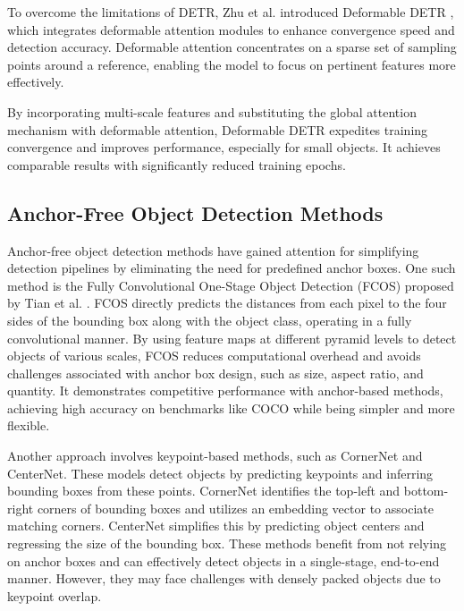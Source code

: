 \documentclass[3p,times]{elsarticle}
\begin{document}
To overcome the limitations of DETR, Zhu et al. introduced Deformable DETR \cite{zhu2021deformabledetrdeformabletransformers}, which integrates deformable attention modules to enhance convergence speed and detection accuracy. Deformable attention concentrates on a sparse set of sampling points around a reference, enabling the model to focus on pertinent features more effectively.

By incorporating multi-scale features and substituting the global attention mechanism with deformable attention, Deformable DETR expedites training convergence and improves performance, especially for small objects. It achieves comparable results with significantly reduced training epochs.

\subsection{Anchor-Free Object Detection Methods}

Anchor-free object detection methods have gained attention for simplifying detection pipelines by eliminating the need for predefined anchor boxes. One such method is the Fully Convolutional One-Stage Object Detection (FCOS) proposed by Tian et al. \cite{tian2019fcosfullyconvolutionalonestage}. FCOS directly predicts the distances from each pixel to the four sides of the bounding box along with the object class, operating in a fully convolutional manner. By using feature maps at different pyramid levels to detect objects of various scales, FCOS reduces computational overhead and avoids challenges associated with anchor box design, such as size, aspect ratio, and quantity. It demonstrates competitive performance with anchor-based methods, achieving high accuracy on benchmarks like COCO while being simpler and more flexible.

Another approach involves keypoint-based methods, such as CornerNet \cite{law2019cornernetdetectingobjectspaired} and CenterNet\cite{duan2019centernetkeypointtripletsobject}. These models detect objects by predicting keypoints and inferring bounding boxes from these points. CornerNet identifies the top-left and bottom-right corners of bounding boxes and utilizes an embedding vector to associate matching corners. CenterNet simplifies this by predicting object centers and regressing the size of the bounding box. These methods benefit from not relying on anchor boxes and can effectively detect objects in a single-stage, end-to-end manner. However, they may face challenges with densely packed objects due to keypoint overlap.
\end{document}
